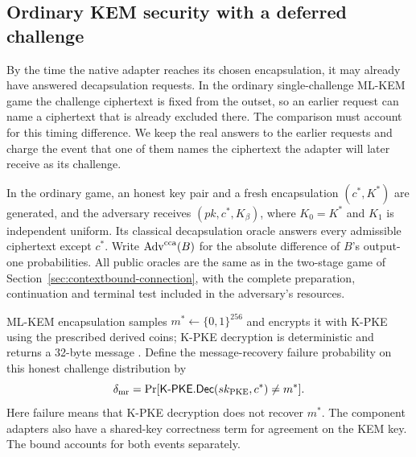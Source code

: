 \subsection{Ordinary KEM security with a deferred challenge}
\label{sec:kem-ordinary-bridge}

By the time the native adapter reaches its chosen encapsulation, it
may already have answered decapsulation requests. In the ordinary
single-challenge ML-KEM game the challenge ciphertext is fixed from
the outset, so an earlier request can name a ciphertext that is already
excluded there. The comparison must account for this timing difference.
We keep the real answers to the earlier requests and charge the event
that one of them names the ciphertext the adapter will later receive
as its challenge.

In the ordinary game, an honest key pair and a fresh encapsulation
$(c^*,K^*)$ are generated, and the adversary receives
$(pk,c^*,K_\beta)$, where $K_0=K^*$ and $K_1$ is independent uniform.
Its classical decapsulation oracle answers every admissible ciphertext
except $c^*$. Write $\operatorname{Adv}^{\rm cca}(B)$ for the absolute
difference of $B$'s output-one probabilities. All public oracles are the
same as in the two-stage game of
Section~\ref{sec:contextbound-connection}, with the complete preparation,
continuation and terminal test included in the adversary's resources.

ML-KEM encapsulation samples $m^*\gets\{0,1\}^{256}$ and encrypts it
with K-PKE using the prescribed derived coins; K-PKE decryption is
deterministic and returns a 32-byte message
\cite[Algorithms 14--17 and 20]{fips203}. Define the message-recovery
failure probability on this honest challenge distribution by
\[
 \delta_{\rm mr}
 =\Pr[\mathsf{K\mbox{-}PKE.Dec}(sk_{\rm PKE},c^*)\ne m^*].
\]
Here failure means that K-PKE decryption does not recover $m^*$.
The component adapters also have a shared-key correctness term for
agreement on the KEM key. The bound accounts for both events separately.

